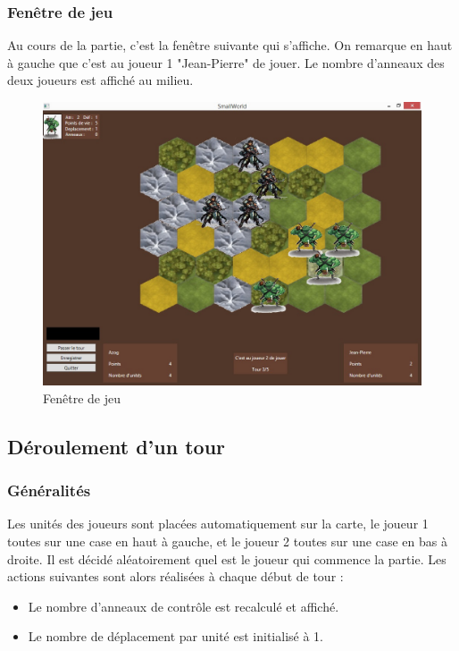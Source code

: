 \subsubsection{Fenêtre de jeu}
Au cours de la partie, c'est la fenêtre suivante qui s'affiche. On remarque en haut à gauche que c'est au joueur 1 "Jean-Pierre" de jouer. Le nombre d'anneaux des deux joueurs est affiché au milieu.

\begin{figure}[ht!]
\centering
\includegraphics[scale=0.50]{img/jeu.jpg}
\caption{Fenêtre de jeu}
\end{figure}
\newpage

\subsection{Déroulement d'un tour}
\subsubsection{Généralités}

Les unités des joueurs sont placées automatiquement sur la carte, le joueur 1 toutes sur une case en haut à gauche, et le joueur 2 toutes sur une case en bas à droite. Il est décidé aléatoirement quel est le joueur qui commence la partie.
\newline
\newline
Les actions suivantes sont alors réalisées à chaque début de tour :
\begin{itemize}
\item Le nombre d'anneaux de contrôle est recalculé et affiché.
\item Le nombre de déplacement par unité est initialisé à 1.
\end{itemize}

